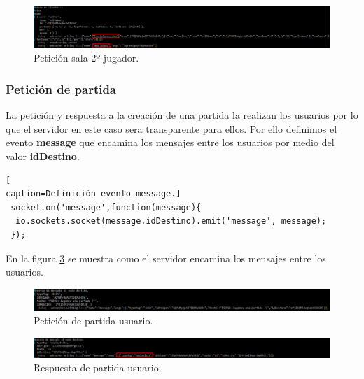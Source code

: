 \begin{figure}[!h]
\begin{center}
  \includegraphics[width=0.9\linewidth]{Figures/Init_Room_2}
	\decoRule
	\caption[ServidorSeñalizacion]{Petición sala 2º jugador.}
\label{fig:Init_Room_2}
\end{center}
\end{figure}
\subsubsection{Petición de partida}
La petición y respuesta a la creación de una partida la realizan los usuarios por lo que el servidor en este caso sera transparente para ellos. Por ello definimos el evento \textbf{message} que encamina los mensajes entre los usuarios por medio del valor \textbf{idDestino}.
\begin{lstlisting}[
caption=Definición evento message.]
 socket.on('message',function(message){
  io.sockets.socket(message.idDestino).emit('message', message);
 });
\end{lstlisting}
En la figura \ref{fig:ServerMessage} se muestra como el servidor encamina los mensajes entre los usuarios.
\begin{figure}[!h]
\begin{center}
  \includegraphics[width=0.9\linewidth]{Figures/Server_Message}
	\decoRule
	\caption[Petición de partida usuario.]{Petición de partida usuario.}
\label{fig:ServerMessage}
\end{center}
\end{figure}
\begin{figure}[!h]
\begin{center}
  \includegraphics[width=0.9\linewidth]{Figures/Server_Message_2}
	\decoRule
	\caption[Respuesta de partida usuario.]{Respuesta de partida usuario.}
\label{fig:ServerMessage}
\end{center}
\end{figure}
